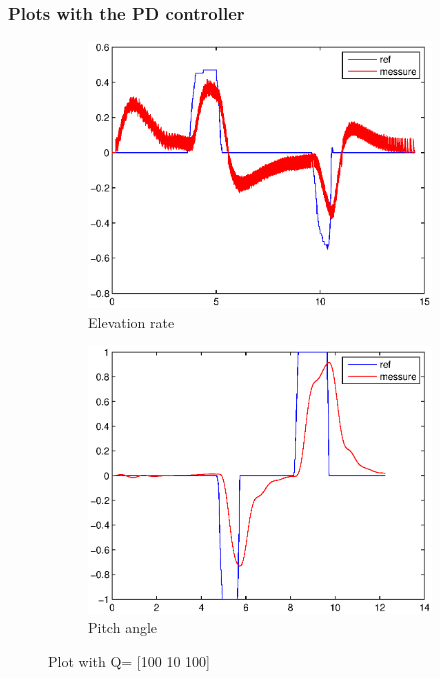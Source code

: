 \subsubsection{Plots with the PD controller}
\begin{figure}[H]
\graphicspath{ {Part3_pictures/}}
\begin{subfigure}{0.5\textwidth}
    \includegraphics[width=0.9\linewidth]{Part3_pictures/p3p2/Q1elevation.eps} 
    \caption{Elevation rate}
    \label{p3p2Q1e}
\end{subfigure}
\begin{subfigure}{0.5\textwidth}
    \includegraphics[width=0.9\linewidth]{Part3_pictures/p3p2/Q1pitch.eps}
    \caption{Pitch angle}
    \label{p3p2Q1p}
\end{subfigure}
\caption{Plot with Q= [100 10 100]}
\label{p3p2Q1}
\end{figure}

